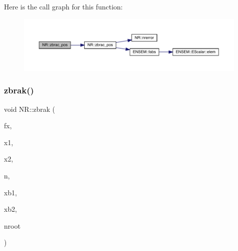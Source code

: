 Here is the call graph for this function\+:
\nopagebreak
\begin{figure}[H]
\begin{center}
\leavevmode
\includegraphics[width=350pt]{da/d46/namespaceNR_afec512a07e73837d2a2f77ccbbce93db_cgraph}
\end{center}
\end{figure}
\mbox{\label{namespaceNR_a83128554a5aed28c6d59ecb925577945}} 
\subsubsection{\texorpdfstring{zbrak()}{zbrak()}\hspace{0.1cm}{\footnotesize\ttfamily [1/2]}}
{\footnotesize\ttfamily void N\+R\+::zbrak (\begin{DoxyParamCaption}\item[{const \mbox{\hyperlink{classNR_1_1ScalFunc}{Scal\+Func}} \&}]{fx,  }\item[{const \mbox{\hyperlink{namespaceNR_af6ff762dd605ff477b8e52387253a02a}{DP}}}]{x1,  }\item[{const \mbox{\hyperlink{namespaceNR_af6ff762dd605ff477b8e52387253a02a}{DP}}}]{x2,  }\item[{const int}]{n,  }\item[{\mbox{\hyperlink{namespaceNR_a970094d23441f8ef6a45282a7eb2103d}{Vec\+\_\+\+O\+\_\+\+DP}} \&}]{xb1,  }\item[{\mbox{\hyperlink{namespaceNR_a970094d23441f8ef6a45282a7eb2103d}{Vec\+\_\+\+O\+\_\+\+DP}} \&}]{xb2,  }\item[{int \&}]{nroot }\end{DoxyParamCaption})}

